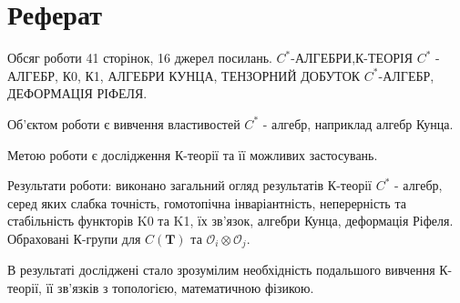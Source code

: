 \newpage
\section*{Реферат}
\label{sec:referat}
Обсяг роботи 41 сторінок, 16 джерел посилань.
$C^*$-АЛГЕБРИ,К-ТЕОРІЯ $C^*$ - АЛГЕБР, К0, К1, АЛГЕБРИ КУНЦА,
ТЕНЗОРНИЙ ДОБУТОК $C^*$-АЛГЕБР, ДЕФОРМАЦІЯ РІФЕЛЯ.

Об’єктом роботи є вивчення властивостей $C^*$ - алгебр, наприклад алгебр Кунца.

Метою роботи є дослідження К-теорії та її можливих застосувань.

Результати роботи: виконано загальний огляд результатів К-теорії $C^*$ - алгебр,
серед яких слабка точність, гомотопічна інваріантність, неперерність та
стабільність функторів K0 та K1, їх зв'язок, алгебри Кунца, деформація
Ріфеля.
Обраховані К-групи для $C(\mathbf{T})$ та $\mathcal{O}_i \otimes \mathcal{O}_j$.

В результаті досліджені стало зрозумілим необхідність подальшого вивчення
К-теорії, її зв'язків з топологією, математичною фізикою.

